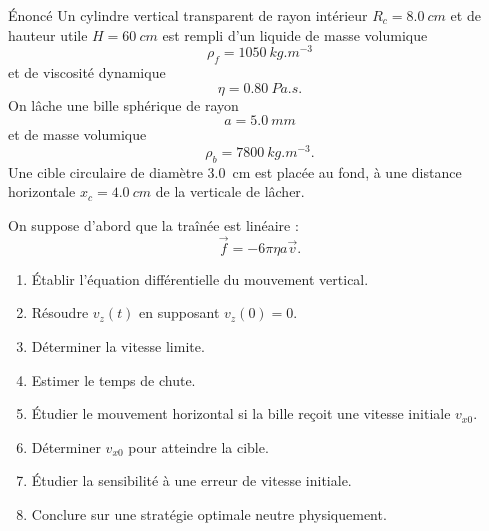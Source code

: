 \documentclass[11pt,a4paper]{article}
\begin{document}
\begin{exercisebox}{Énoncé}{}
Un cylindre vertical transparent de rayon intérieur $R_c=\SI{8.0}{cm}$ et de hauteur utile $H=\SI{60}{cm}$ est rempli d'un liquide de masse volumique
\[
\rho_f=\SI{1050}{kg.m^{-3}}
\]
et de viscosité dynamique
\[
\eta=\SI{0.80}{Pa.s}.
\]
On lâche une bille sphérique de rayon
\[
a=\SI{5.0}{mm}
\]
et de masse volumique
\[
\rho_b=\SI{7800}{kg.m^{-3}}.
\]
Une cible circulaire de diamètre \SI{3.0}{cm} est placée au fond, à une distance horizontale $x_c=\SI{4.0}{cm}$ de la verticale de lâcher.

On suppose d'abord que la traînée est linéaire :
\[
\vec f=-6\pi\eta a\vec v.
\]

\begin{enumerate}
  \item Établir l'équation différentielle du mouvement vertical.
  \item Résoudre $v_z(t)$ en supposant $v_z(0)=0$.
  \item Déterminer la vitesse limite.
  \item Estimer le temps de chute.
  \item Étudier le mouvement horizontal si la bille reçoit une vitesse initiale $v_{x0}$.
  \item Déterminer $v_{x0}$ pour atteindre la cible.
  \item Étudier la sensibilité à une erreur de vitesse initiale.
  \item Conclure sur une stratégie optimale neutre physiquement.
\end{enumerate}
\end{exercisebox}

\begin{center}
\end{center}
\end{document}
